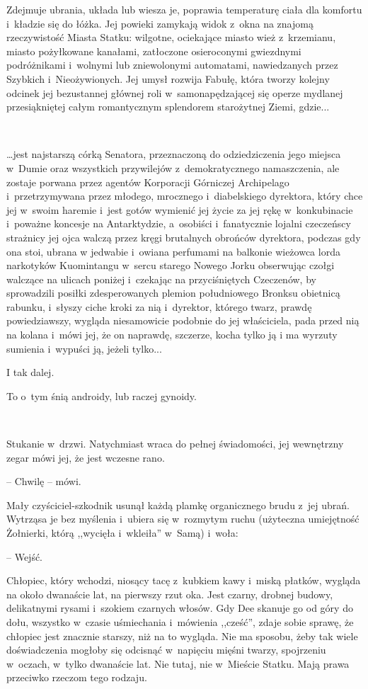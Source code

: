 \documentclass[oneside,polish,11pt,sfheadings]{mwbk}
\begin{document}
Zdejmuje ubrania, układa lub wiesza je, poprawia temperaturę ciała dla
komfortu i~kładzie się do łóżka. Jej powieki zamykają widok z~okna na
znajomą rzeczywistość Miasta Statku: wilgotne, ociekające miasto wież z~krzemianu, miasto pożyłkowane kanałami, zatłoczone osieroconymi
gwiezdnymi podróżnikami i~wolnymi lub zniewolonymi automatami,
nawiedzanych przez Szybkich i~Nieożywionych. Jej umysł rozwija Fabułę,
która tworzy kolejny odcinek jej bezustannej głównej roli w~samonapędzającej się operze mydlanej przesiąkniętej całym romantycznym
splendorem starożytnej Ziemi, gdzie...

~

\ldots jest najstarszą córką Senatora, przeznaczoną do odziedziczenia jego
miejsca w~Dumie oraz wszystkich przywilejów z~demokratycznego
namaszczenia, ale zostaje porwana przez agentów Korporacji Górniczej
Archipelago i~przetrzymywana przez młodego, mrocznego i~diabelskiego
dyrektora, który chce jej w~swoim haremie i~jest gotów wymienić jej
życie za jej rękę w~konkubinacie i~poważne koncesje na Antarktydzie, a~osobiści i~fanatycznie lojalni czeczeńscy strażnicy jej ojca walczą
przez kręgi brutalnych obrońców dyrektora, podczas gdy ona stoi, ubrana
w jedwabie i~owiana perfumami na balkonie wieżowca lorda narkotyków
Kuomintangu w~sercu starego Nowego Jorku obserwując czołgi walczące na
ulicach poniżej i~czekając na przyciśniętych Czeczenów, by sprowadzili
posiłki zdesperowanych plemion południowego Bronksu obietnicą rabunku, i~słyszy ciche kroki za nią i~dyrektor, którego twarz, prawdę
powiedziawszy, wygląda niesamowicie podobnie do jej właściciela, pada
przed nią na kolana i~mówi jej, że on naprawdę, szczerze, kocha tylko ją
i ma wyrzuty sumienia i~wypuści ją, jeżeli tylko...

I tak dalej.

To o~tym śnią androidy, lub raczej gynoidy.

~

Stukanie w~drzwi. Natychmiast wraca do pełnej świadomości, jej
wewnętrzny zegar mówi jej, że jest wczesne rano.

-- Chwilę -- mówi.

Mały czyściciel-szkodnik usunął każdą plamkę organicznego brudu z~jej
ubrań. Wytrząsa je bez myślenia i~ubiera się w~rozmytym ruchu (użyteczna
umiejętność Żołnierki, którą ,,wycięła i~wkleiła'' w~Samą) i~woła:

-- Wejść.

Chłopiec, który wchodzi, niosący tacę z~kubkiem kawy i~miską płatków,
wygląda na około dwanaście lat, na pierwszy rzut oka. Jest czarny,
drobnej budowy, delikatnymi rysami i~szokiem czarnych włosów. Gdy Dee
skanuje go od góry do dołu, wszystko w~czasie uśmiechania i~mówienia
,,cześć'', zdaje sobie sprawę, że chłopiec jest znacznie starszy, niż na
to wygląda. Nie ma sposobu, żeby tak wiele doświadczenia mogłoby się
odcisnąć w~napięciu mięśni twarzy, spojrzeniu w~oczach, w~tylko
dwanaście lat. Nie tutaj, nie w~Mieście Statku. Mają prawa przeciwko
rzeczom tego rodzaju.
\end{document}
